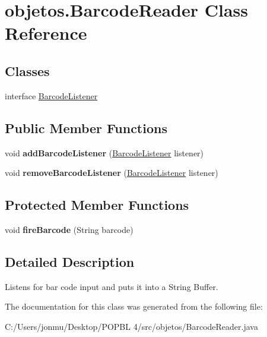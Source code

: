 \hypertarget{classobjetos_1_1_barcode_reader}{}\section{objetos.\+Barcode\+Reader Class Reference}
\label{classobjetos_1_1_barcode_reader}
\subsection*{Classes}
\begin{DoxyCompactItemize}
\item 
interface \mbox{\hyperlink{interfaceobjetos_1_1_barcode_reader_1_1_barcode_listener}{Barcode\+Listener}}
\end{DoxyCompactItemize}
\subsection*{Public Member Functions}
\begin{DoxyCompactItemize}
\item 
\mbox{\label{classobjetos_1_1_barcode_reader_a7c0a8f3e684c72a78005c97f3d9cdc24}} 
void {\bfseries add\+Barcode\+Listener} (\mbox{\hyperlink{interfaceobjetos_1_1_barcode_reader_1_1_barcode_listener}{Barcode\+Listener}} listener)
\item 
\mbox{\label{classobjetos_1_1_barcode_reader_a4b49668d25796160e591b78b89b287eb}} 
void {\bfseries remove\+Barcode\+Listener} (\mbox{\hyperlink{interfaceobjetos_1_1_barcode_reader_1_1_barcode_listener}{Barcode\+Listener}} listener)
\end{DoxyCompactItemize}
\subsection*{Protected Member Functions}
\begin{DoxyCompactItemize}
\item 
\mbox{\label{classobjetos_1_1_barcode_reader_a1cd53567cad388b796e540c7a9240bf7}} 
void {\bfseries fire\+Barcode} (String barcode)
\end{DoxyCompactItemize}


\subsection{Detailed Description}
Listens for bar code input and puts it into a String Buffer. 

The documentation for this class was generated from the following file\+:\begin{DoxyCompactItemize}
\item 
C\+:/\+Users/jonmu/\+Desktop/\+P\+O\+P\+B\+L 4/src/objetos/Barcode\+Reader.\+java\end{DoxyCompactItemize}

